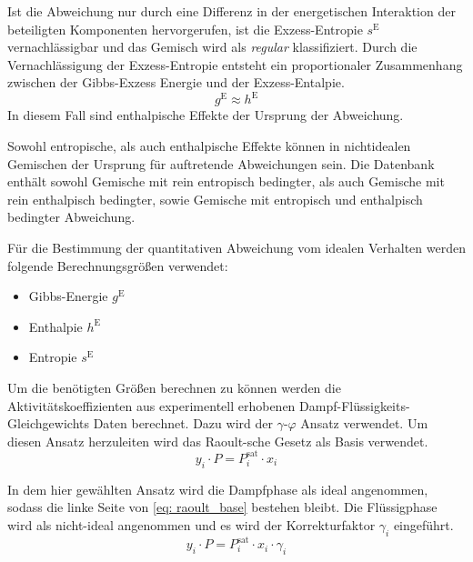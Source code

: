 \documentclass[../thesis.tex]{subfiles}
\begin{document}
Ist die Abweichung nur durch eine Differenz in der energetischen Interaktion der beteiligten Komponenten hervorgerufen, ist die Exzess-Entropie $s^{\mathrm{E}}$ vernachlässigbar und das Gemisch wird als \textit{regular} klassifiziert. Durch die Vernachlässigung der Exzess-Entropie entsteht ein proportionaler Zusammenhang zwischen der Gibbs-Exzess Energie und der Exzess-Entalpie.
\begin{equation}
	g^{\mathrm{E}} \approx h^{\mathrm{E}}
\end{equation}
In diesem Fall sind enthalpische Effekte der Ursprung der Abweichung.

Sowohl entropische, als auch enthalpische Effekte können in nichtidealen Gemischen der Ursprung für auftretende Abweichungen sein. Die Datenbank enthält sowohl Gemische mit rein entropisch bedingter, als auch Gemische mit rein enthalpisch bedingter, sowie Gemische mit entropisch und enthalpisch bedingter Abweichung.

Für die Bestimmung der quantitativen Abweichung vom idealen Verhalten werden folgende Berechnungsgrößen verwendet:
\begin{itemize}
	\item Gibbs-Energie $g^{\mathrm{E}}$
	\item Enthalpie $h^{\mathrm{E}}$
	\item Entropie $s^{\mathrm{E}}$
\end{itemize}

Um die benötigten Größen berechnen zu können werden die Aktivitätskoeffizienten aus experimentell erhobenen Dampf-Flüssigkeits-Gleichgewichts Daten berechnet. Dazu wird der $\gamma$-$\varphi$ Ansatz verwendet. Um diesen Ansatz herzuleiten wird das Raoult-sche Gesetz als Basis verwendet.
\begin{equation}
	\label{eq: raoult_base}
	y_i \cdot P = P_{i}^{\mathrm{sat}} \cdot x_i
\end{equation}

In dem hier gewählten Ansatz wird die Dampfphase als ideal angenommen, sodass die linke Seite von \autoref{eq: raoult_base} bestehen bleibt. Die Flüssigphase wird als nicht-ideal angenommen und es wird der Korrekturfaktor $\gamma_i$ eingeführt.
\begin{equation}
	\label{eq: raoult_mod}
	y_i \cdot P = P_{i}^{\mathrm{sat}} \cdot x_i \cdot \gamma_i
\end{equation}
\end{document}
